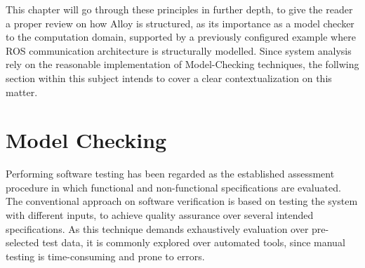 This chapter will go through these principles in further depth, to give the reader a proper review on how Alloy is structured, as its importance as a model checker to the computation domain, supported by a previously configured example where ROS communication architecture is structurally modelled. Since system analysis rely on the reasonable implementation of Model-Checking techniques, the follwing section within this subject intends to cover a clear contextualization on this matter. %

\section{Model Checking}


Performing software testing has been regarded as the established assessment procedure in which functional and non-functional specifications are evaluated. The conventional approach on software verification is based on testing the system with different inputs, to achieve quality assurance over several intended specifications. \cite{beyer2017software, briand2001uml} As this technique demands exhaustively evaluation over pre-selected test data, it is commonly explored over automated tools, since manual testing is time-consuming and prone to errors. \cite{clarke1976program, fraser2009testing} 



